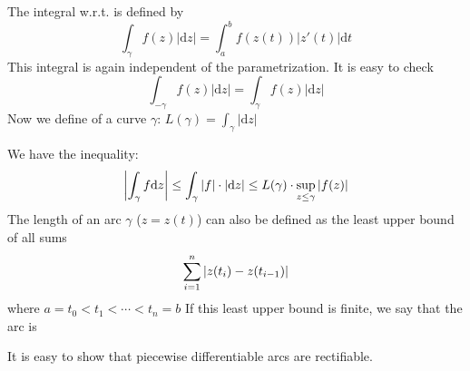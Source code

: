 The integral w.r.t.  is defined by 
\[\int_\gamma f(z)|\mathrm{d}z|=\int_a^bf(z(t))|z'(t)|\mathrm{d}t\]
This integral is again independent of the parametrization. It is easy to check 
\[\int_{-\gamma}f(z)|\mathrm{d}z|=\int_\gamma f(z)|\mathrm{d}z|\]
Now we define  of a curve  $ \gamma $: $ L(\gamma)=\int_\gamma |\mathrm{d}z| $ 

We have the inequality: 
\[\displaystyle\left|\int_\gamma f\mathrm{d}z\right| \leq \int_\gamma |f| \cdot|\mathrm{d}z| \leq L(\gamma)\cdot \sup\limits_{z \leq \gamma}|f(z)|\]
The length of an arc  $ \gamma $ ($ z=z(t) $) can also be defined as the least upper bound of all sums 
\[\displaystyle\sum_{i=1}^n |z(t_i)-z(t_{i-1})|\]
where  $ a=t_0<t_1<\cdots<t_n=b $ 
If this least upper bound is finite, we say that the arc is 

It is easy to show that piecewise differentiable arcs are rectifiable.


